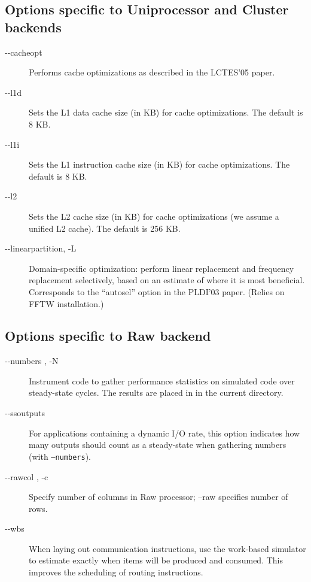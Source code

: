 \subsection*{Options specific to Uniprocessor and Cluster backends}
\begin{description}

\item [-{}-cacheopt]
Performs cache optimizations as described in the LCTES'05 paper.

\item [-{}-l1d ]
Sets the L1 data cache size (in KB) for cache optimizations.  The
default is 8 KB.

\item [-{}-l1i ]
Sets the L1 instruction cache size (in KB) for cache optimizations.
The default is 8 KB.

\item [-{}-l2 ]
Sets the L2 cache size (in KB) for cache optimizations (we assume a
unified L2 cache).  The default is 256 KB.

\item [-{}-linearpartition, -L]
Domain-specific optimization: perform linear replacement and frequency
replacement selectively, based on an estimate of where it is most
beneficial.  Corresponds to the ``autosel'' option in the PLDI'03
paper.  (Relies on FFTW installation.)

\end{description}

\subsection*{Options specific to Raw backend}
\begin{description}
\item [-{}-numbers , -N]
Instrument code to gather performance statistics on simulated code
over  steady-state cycles. The results are placed in
 in the current directory.

\item [-{}-ssoutputs ]
For applications containing a dynamic I/O rate, this option indicates
how many outputs should count as a steady-state when gathering numbers
(with \texttt{--numbers}).

\item [-{}-rawcol , -c]
Specify number of columns in Raw processor; --raw specifies number of rows.

\item [-{}-wbs] When laying out communication instructions, use the 
work-based simulator to estimate exactly when items will be produced
and consumed.  This improves the scheduling of routing instructions.

\end{description}
